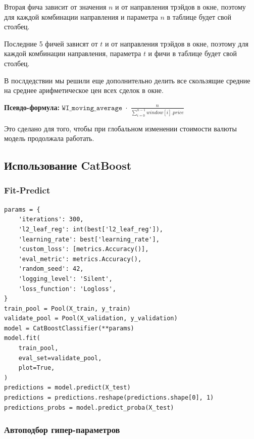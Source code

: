 Вторая фича зависит от значения $n$ и от направления трэйдов в окне, поэтому для каждой комбинации направления и параметра $n$ в таблице будет свой столбец.

Последние 5 фичей зависят от $t$ и от направления трэйдов в окне, поэтому для каждой комбинации направления, параметра $t$ и фичи в таблице будет свой столбец.

В послдедствии мы решили еще дополнительно делить все скользящие средние на среднее арифметическое цен всех сделок в окне. 

\textbf{Псевдо-формула:} $\texttt{WI\_moving\_average} \; \cdot \; \frac{n}{\sum\limits_{i=0}^{n - 1} window[i].price}$ 

Это сделано для того, чтобы при глобальном изменении стоимости валюты модель продолжала работать.


\subsection{Использование CatBoost}

\subsubsection{Fit-Predict}

\begin{verbatim}
params = {
    'iterations': 300,
    'l2_leaf_reg': int(best['l2_leaf_reg']),
    'learning_rate': best['learning_rate'],
    'custom_loss': [metrics.Accuracy()],
    'eval_metric': metrics.Accuracy(),
    'random_seed': 42,
    'logging_level': 'Silent',
    'loss_function': 'Logloss',
}
train_pool = Pool(X_train, y_train)
validate_pool = Pool(X_validation, y_validation)
model = CatBoostClassifier(**params)
model.fit(
    train_pool,
    eval_set=validate_pool,
    plot=True,
)
predictions = model.predict(X_test)
predictions = predictions.reshape(predictions.shape[0], 1)
predictions_probs = model.predict_proba(X_test)
\end{verbatim}

\subsubsection{Автоподбор гипер-параметров}

